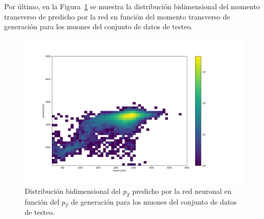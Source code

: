 Por \'ultimo, en la Figura~\ref{fig:ptpred_tuneppt} se muestra la distribuci\'on bidimensional del momento transverso de predicho por la red en funci\'on del momento transverso de generaci\'on para los muones del conjunto de datos de testeo. \\

\begin{figure}[h]
\centering
\includegraphics[width=1.0\textwidth]{figures/data_test_ptpred_genpt.png}
\caption{Distribuci\'on bidimensional del $p_{T}$ predicho por la red neuronal en funci\'on del $p_{T}$ de generaci\'on para los muones del conjunto de datos de testeo.}
\label{fig:ptpred_tuneppt}  
\end{figure}



\clearpage
